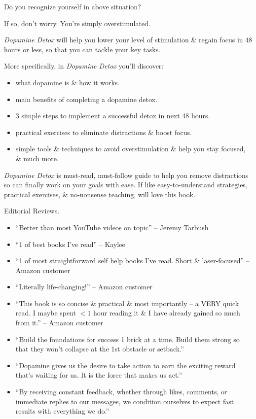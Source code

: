 \documentclass{article}
\begin{document}
\begin{enumerate}
	Do you recognize yourself in above situation?
	
	If so, don't worry. You're simply overstimulated.
	
	{\it Dopamine Detox} will help you lower your level of stimulation \& regain focus in 48 hours or less, so that you can tackle your key tasks.
	
	More specifically, in {\it Dopamine Detox} you'll discover:
	\begin{itemize}
		\item what dopamine is \& how it works.
		\item main benefits of completing a dopamine detox.
		\item 3 simple steps to implement a successful detox in next 48 hours.
		\item practical exercises to eliminate distractions \& boost focus.
		\item simple tools \& techniques to avoid overstimulation \& help you stay focused, \& much more.
	\end{itemize}
	{\it Dopamine Detox} is must-read, must-follow guide to help you remove distractions so can finally work on your goals with ease. If like easy-to-understand strategies, practical exercises, \& no-nonsense teaching, will love this book.	
	
	{\sf Editorial Reviews.}
	\begin{itemize}
		\item ``Better than most YouTube videos on topic'' -- {\sc Jeremy Tarbush}
		\item ``1 of best books I've read'' -- {\sc Kaylee}
		\item ``1 of most straightforward self help books I've read. Short \& laser-focused'' -- Amazon customer
		\item ``Literally life-changing!'' -- Amazon customer
		\item ``This book is so concise \& practical \& most importantly -- a VERY quick read. I maybe spent $< 1$ hour reading it \& I have already gained so much from it.'' -- Amazon customer
	\end{itemize}
	\begin{itemize}
		\item ``Build the foundations for success 1 brick at a time. Build them strong so that they won't collapse at the 1st obstacle or setback.''
		\item ``Dopamine gives us the desire to take action to earn the exciting reward that's waiting for us. It is the force that makes us act.''
		\item ``By receiving constant feedback, whether through likes, comments, or immediate replies to our messages, we condition ourselves to expect fast results with everything we do.''
	\end{itemize}
	

\end{enumerate}
\end{document}
